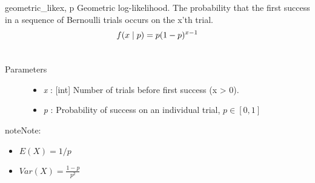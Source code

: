 \hypertarget{pymc.distributions.geometric_like}{}\begin{funcdesc}{geometric\_like}{x, p}
Geometric log-likelihood. The probability that the first success in a
sequence of Bernoulli trials occurs on the x'th trial.
\begin{gather}
\begin{split}f(x \mid p) = p(1-p)^{x-1}\end{split}\notag\\\begin{split}\end{split}\notag
\end{gather}\begin{description}
\item[Parameters] \leavevmode\begin{itemize}
\item {}
\emph{x} : {[}int{]} Number of trials before first success (x \textgreater{} 0).

\item {}
\emph{p} : Probability of success on an individual trial, $p \in [0,1]$

\end{itemize}

\end{description}

\begin{notice}{note}{Note:}\begin{itemize}
\item {}
$E(X)=1/p$

\item {}
$Var(X)=\frac{1-p}{p^2}$

\end{itemize}
\end{notice}
\end{funcdesc}


